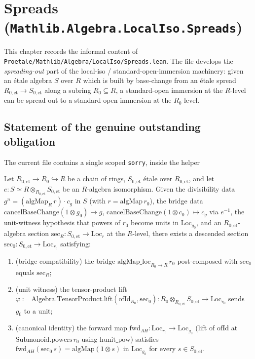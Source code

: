 \chapter{Spreads (\texorpdfstring{\texttt{Mathlib.Algebra.LocalIso.Spreads}}{Spreads})}
\label{chap:mathlib-algebra-localiso-spreads}

This chapter records the informal content of
\texttt{Proetale/Mathlib/Algebra/LocalIso/Spreads.lean}. The file develops the
\emph{spreading-out} part of the local-iso / standard-open-immersion machinery:
given an \'etale algebra $S$ over $R$ which is built by base-change from an
\'etale spread $R_{0,\mathrm{et}} \to S_{0,\mathrm{et}}$ along a subring
$R_0 \subseteq R$, a standard-open immersion at the $R$-level can be spread out
to a standard-open immersion at the $R_0$-level.

\section{Statement of the genuine outstanding obligation}
\label{sec:spreads-genuine-obligation}

The current file contains a single scoped \texttt{sorry}, inside the helper

\begin{lemma}
  \label{lem:section-descends-to-R0}
  Let $R_{0,\mathrm{et}} \to R_0 \hookrightarrow R$ be a chain of rings,
  $S_{0,\mathrm{et}}$ \'etale over $R_{0,\mathrm{et}}$, and let
  $e : S \simeq R \otimes_{R_{0,\mathrm{et}}} S_{0,\mathrm{et}}$ be an
  $R$-algebra isomorphism. Given the divisibility data
  $g^n = (\mathrm{algMap}_R\, r)\cdot c_g$ in $S$ (with $r = \mathrm{algMap}\, r_0$),
  the bridge data $\mathrm{cancelBaseChange}(1 \otimes g_0) \mapsto g$,
  $\mathrm{cancelBaseChange}(1 \otimes c_0) \mapsto c_g$ via $e^{-1}$, the
  unit-witness hypothesis that powers of $r_0$ become units in
  $\mathrm{Loc}_{g_0}$, and an $R_{0,\mathrm{et}}$-algebra section
  $\mathrm{sec}_R : S_{0,\mathrm{et}} \to \mathrm{Loc}_{r}$ at the $R$-level,
  there exists a descended section
  $\mathrm{sec}_0 : S_{0,\mathrm{et}} \to \mathrm{Loc}_{r_0}$ satisfying:
  \begin{enumerate}
  \item (bridge compatibility) the bridge
    $\mathrm{algMap\_loc}_{R_0 \to R}\, r_0$ post-composed with $\mathrm{sec}_0$
    equals $\mathrm{sec}_R$;
  \item (unit witness) the tensor-product lift
    $\varphi := \mathrm{Algebra.TensorProduct.lift}(\mathrm{ofId}_{R_0}, \mathrm{sec}_0)
    : R_0 \otimes_{R_{0,\mathrm{et}}} S_{0,\mathrm{et}} \to \mathrm{Loc}_{r_0}$
    sends $g_0$ to a unit;
  \item (canonical identity) the forward map
    $\mathrm{fwd}_{AH} : \mathrm{Loc}_{r_0} \to \mathrm{Loc}_{g_0}$
    (lift of $\mathrm{ofId}$ at $\mathrm{Submonoid.powers}\, r_0$ using
    $\mathrm{hunit\_pow}$) satisfies
    $\mathrm{fwd}_{AH}(\mathrm{sec}_0\, s) = \mathrm{algMap}(1 \otimes s)$ in
    $\mathrm{Loc}_{g_0}$ for every $s \in S_{0,\mathrm{et}}$.
  \end{enumerate}
\end{lemma}

